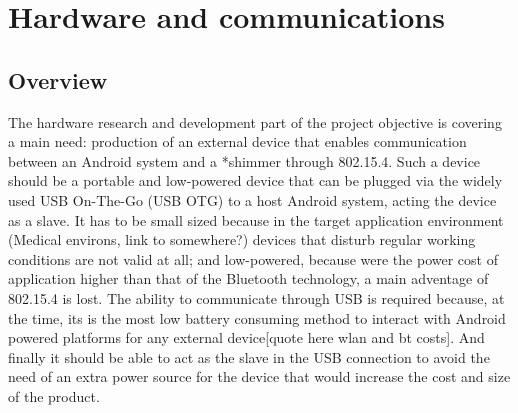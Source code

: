 \chapter{Hardware and communications}
\label{ch:hardware}
	\section{Overview}	


	The hardware research and development part of the project objective is covering a main need: production of an external device that enables communication between an Android system and a *shimmer through 802.15.4. Such a device should be a portable and low-powered device that can be plugged via the widely used USB On-The-Go (USB OTG) to a host Android system, acting the device as a slave. It has to be small sized because in the target application environment (Medical environs, link to somewhere?) devices that disturb regular working conditions are not valid at all; and low-powered, because were the power cost of application higher than that of the Bluetooth technology, a main adventage of 802.15.4 is lost. The ability to communicate through USB is required because, at the time, its is the most low battery consuming method to interact with Android powered platforms for any external device[quote here wlan and bt costs]. And finally it should be able to act as the slave in the USB connection to avoid the need of an extra power source for the device that would increase the cost and size of the product.\\


